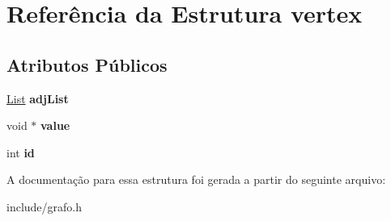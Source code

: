\hypertarget{structvertex}{}\section{Referência da Estrutura vertex}
\label{structvertex}
\subsection*{Atributos Públicos}
\begin{DoxyCompactItemize}
\item 
\mbox{\label{structvertex_a30d637066c3489c97598af69394d187e}} 
\hyperlink{structlistNode}{List} {\bfseries adj\+List}
\item 
\mbox{\label{structvertex_aa610e7fdb75c270e113b935187b31276}} 
void $\ast$ {\bfseries value}
\item 
\mbox{\label{structvertex_a174bbdee712ca98fb591504ce66ed006}} 
int {\bfseries id}
\end{DoxyCompactItemize}


A documentação para essa estrutura foi gerada a partir do seguinte arquivo\+:\begin{DoxyCompactItemize}
\item 
include/grafo.\+h\end{DoxyCompactItemize}

